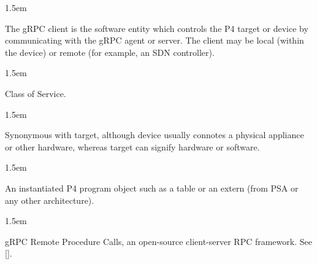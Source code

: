 \documentclass[11pt]{article}
\begin{document}
{\begin{mddefinitions}

\begin{mdbmarginx}{}{}{}{1.5em}%
\begin{mddefdata}%
The gRPC client is the software entity which controls the P4 target or
device by communicating with the gRPC agent or server. The client may be
local (within the device) or remote (for example, an SDN controller).
\end{mddefdata}%
\end{mdbmarginx}%


\begin{mdbmarginx}{}{}{}{1.5em}%
\begin{mddefdata}%
Class of Service.
\end{mddefdata}%
\end{mdbmarginx}%


\begin{mdbmarginx}{}{}{}{1.5em}%
\begin{mddefdata}%
Synonymous with target, although device usually connotes a physical
appliance or other hardware, whereas target can signify hardware or
software.
\end{mddefdata}%
\end{mdbmarginx}%


\begin{mdbmarginx}{}{}{}{1.5em}%
\begin{mddefdata}%
An instantiated P4 program object such as a table or an extern (from PSA or
any other architecture).
\end{mddefdata}%
\end{mdbmarginx}%


\begin{mdbmarginx}{}{}{}{1.5em}%
\begin{mddefdata}%
gRPC Remote Procedure Calls, an open-source client-server RPC framework. See
[].
\end{mddefdata}%
\end{mdbmarginx}%


\end{mddefinitions}}
\end{document}
